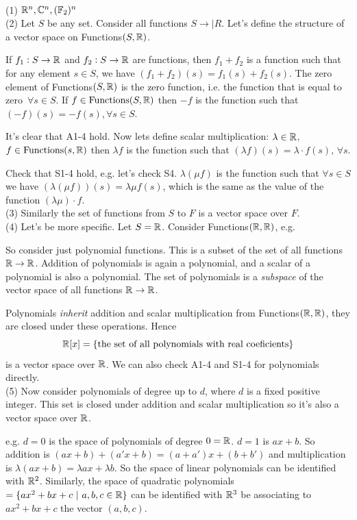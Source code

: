 \documentclass[10pt]{scrartcl}
\begin{document}
\begin{examples}~\\[-.3cm]

(1) $\mathbb{R}^n, \mathbb{C}^n, (\mathbb{F}_2)^n$\\

(2) Let $S$ be any set. Consider all functions $S \to |R$. Let's define the structure of a vector space on Functions$(S,\mathbb{R})$.

If $f_1: S \to \mathbb{R}$ and $f_2: S \to \mathbb{R}$ are functions, then $f_1 + f_2$ is a function such that for any element $s \in S$, we have $(f_1 + f_2)(s) = f_1(s) + f_2(s)$. The zero element of Functions$(S,\mathbb{R})$ is the zero function, i.e. the function that is equal to zero $\, \forall s \in S$. If $f \in \mathrm{Functions}(S,\mathbb{R})$ then $-f$ is the function such that $(-f)(s) = -f(s)$,$\,\forall s \in S$.

It's clear that A1-4 hold. Now lets define scalar multiplication: $\lambda\in\mathbb{R}$, $f \in \mathrm{Functions}(s,\mathbb{R})$ then $\lambda f$ is the function such that $(\lambda f)(s)= \lambda \cdot f(s),\,\forall s$. 

Check that S1-4 hold, e.g. let's check S4. $\lambda(\mu f)$ is the function such that $\forall s \in S$ we have $(\lambda(\mu f))(s) = \lambda \mu f(s)$, which is the same as the value of the function $(\lambda \mu)\cdot f$.\\ 

(3) Similarly the set of functions from $S$ to $F$ is a vector space over $F$.\\

(4) Let's be more specific. Let $S = \mathbb{R}$. Consider Functions$(\mathbb{R},\mathbb{R})$, e.g. 


So consider just polynomial functions. This is a subset of the set of all functions $\mathbb{R} \to \mathbb{R}$. Addition of polynomials is again a polynomial, and a scalar of a polynomial is also a polynomial. The set of polynomials is a \emph{subspace} of the vector space of all functions $\mathbb{R} \to \mathbb{R}$. 

Polynomials \emph{inherit} addition and scalar multiplication from Functions$(\mathbb{R}, \mathbb{R})$, they are closed under these operations. Hence \[\mathbb{R}[x] = \{\text{the set of all polynomials with real coeficients}\}\] is a vector space over $\mathbb{R}$. We can also check A1-4 and S1-4 for polynomials directly. \\[-.2cm]

(5) Now consider polynomials of degree up to $d$, where $d$ is a fixed positive integer. This set is closed under addition and scalar multiplication so it's also a vector space over $\mathbb{R}$. 

e.g. $d=0$ is the space of polynomials of degree $0 = \mathbb{R}$. $d=1$ is $ax + b$. So addition is $(ax + b) + (a'x+b) = (a+a')x  + (b + b')$ and multiplication is $\lambda(ax +b) = \lambda a x + \lambda b$. So the space of linear polynomials can be identified with $\mathbb{R}^2$. Similarly, the space of quadratic polynomials $ = \{ax^2 + bx + c ~|~ a,b,c \in\mathbb{R}\}$ can be identified with $\mathbb{R}^3$ be associating to $ax^2 + bx +c$ the vector $(a,b,c)$. 
\end{examples}
\end{document}
